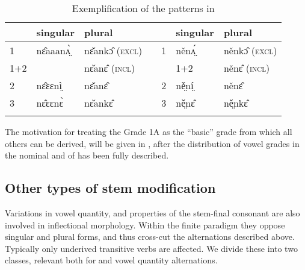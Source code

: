 \documentclass[output=paper,newtxmath,modfonts,nonflat,draftmode]{langsci/langscibook}
\begin{document}
 
\begin{table}
\begin{tabularx}{\textwidth}{lXlXlXl}
\lsptoprule
 & singular & plural &  &  & singular & plural\\
\midrule
 1 & nɛ̂aaanʌ̤̀ & nɛ̌ankɔ̂ (\textsc{excl}) &  & 1 & něnʌ̤́ & něnkɔ̂ (\textsc{excl})\\
 1+2  &        & nɛ̌anɛ̂ (\textsc{incl}) & & & 1+2 & něnɛ̂ (\textsc{incl})\\
 2 & nɛ̂ɛɛnì̤ & nɛ̌anɛ̂ &  & 2 & ně̤ní̤ & něnɛ̂\\
 3 & nɛ̂ɛɛnɛ̀ & nɛ̌ankɛ̂ &  & 3 & ně̤nɛ̂ & ně̤nkɛ̂\\
\lspbottomrule
\end{tabularx}
\caption{Exemplification of the patterns in }
\label{tab:monich:6}
\end{table}

The motivation for treating the Grade 1A as the “basic” grade from which all others can be derived, will be given in , after the distribution of vowel grades in the nominal and  of  has been fully described.

\subsection{Other types of stem modification} %
\label{sec:monich:3.3}

Variations in vowel quantity,  and properties of the stem-final consonant are also involved in inflectional morphology. Within the finite paradigm they oppose singular and plural forms, and thus cross-cut the  alternations described above. Typically only underived transitive verbs are affected. We divide these into two classes, relevant both for  and vowel quantity alternations. 
\end{document}
